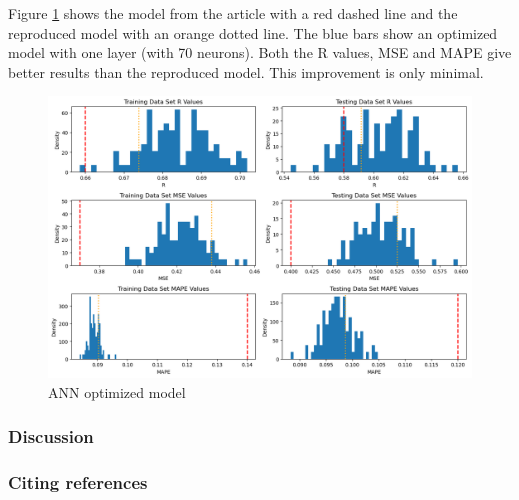\documentclass{article}
\begin{document}
Figure \ref{fig:ANN-optimized-model} shows the model from the article with a red dashed line and the reproduced model with an orange dotted line. The blue bars show an optimized model with one layer (with 70 neurons). Both the R values, MSE and MAPE give better results than the reproduced model. This improvement is only minimal.


\begin{figure}
	\centering
	\includegraphics[width=\linewidth]{figures/ANN_optimized_model.png}
	\caption{ANN optimized model}
	\label{fig:ANN-optimized-model}
\end{figure}




\subsubsection{Discussion}



\subsubsection{Citing references}




\end{document}

